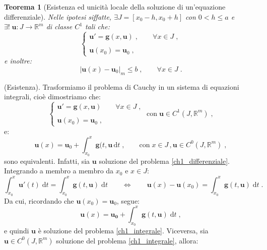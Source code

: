 \documentclass[a4paper,12pt]{report}
\theoremstyle{plain}
\newtheorem{thm}{Teorema}[section]
\theoremstyle{definition}
\theoremstyle{remark}
\newcommand{\diff}[1]{\mathrm{d}#1}
\numberwithin{equation}{section}
\begin{document}
\begin{thm}[Esistenza ed unicità locale della soluzione di un'equazione differenziale]
 Nelle ipotesi siffatte, $\exists J=[x_0-h,x_0+h]$ con $0<h\le a$ e $\exists!\; \mathbf{u}:J \to \mathbb{R}^m$ di classe $C^1$ tali che:
\begin{equation}
\begin{cases}
 \mathbf{u}'=\mathbf{g}(x,\mathbf{u})\;, \qquad \forall x \in J\;, \\
 \\
\mathbf{u}(x_0)=\mathbf{u}_0\;,
\end{cases}
\end{equation}
e inoltre:
\begin{equation}
|\mathbf{u}(x)-\mathbf{u}_0|_{m} \le b \;, \qquad \forall x \in J\;.
\end{equation}
\end{thm}
\proof (Esistenza). Trasformiamo il problema di Cauchy in un sistema di equazioni integrali, cioè dimostriamo che:
\begin{equation}
\begin{cases}
	\mathbf{u}'=\mathbf{g}(x,\mathbf{u})\qquad \forall x\in J\;, \\
	\\
	\mathbf{u}(x_0)=\mathbf{u}_0\;,
	\end{cases}\; \mbox{con}\; \mathbf{u}\in C^1(J,\mathbb{R}^m)\;, \label{ch1_differenziale}
\end{equation}
e:
\begin{equation}
\mathbf{u}(x)=\mathbf{u}_0+\int_{x_0}^x\mathbf{g}(t,\mathbf{u}\,\diff{t}\;,\qquad \mbox{con}\; x\in J\,, \mathbf{u}\in C^0(J,\mathbb{R}^m)\;, \label{ch1_integrale}
\end{equation}
sono equivalenti. Infatti, sia $\mathbf{u}$ soluzione del problema \eqref{ch1_differenziale}. Integrando a membro a membro da $x_0$ e $x \in J$:
\begin{equation}
\int_{x_0}^x \mathbf{u}'(t)\;\diff{t} = \int_{x_0}^x \mathbf{g}(t,\mathbf{u})\;\diff{t}\qquad \Longleftrightarrow\qquad \mathbf{u}(x)-\mathbf{u}(x_0)=\int_{x_0}^x \mathbf{g}(t, \mathbf{u})\;\diff{t}\;.
\end{equation}
Da cui, ricordando che $\mathbf{u}(x_0)=\mathbf{u}_0$, segue:
\begin{equation}
\mathbf{u}(x)=\mathbf{u_0}+\int_{x_0}^x \mathbf{g}(t,\mathbf{u})\;\diff{t}\;,
\end{equation}
e quindi $\mathbf{u}$ è soluzione del problema \eqref{ch1_integrale}. Viceversa, sia $\mathbf{u} \in C^0(J,\mathbb{R}^m)$ soluzione del problema \eqref{ch1_integrale}, allora:
\end{document}

